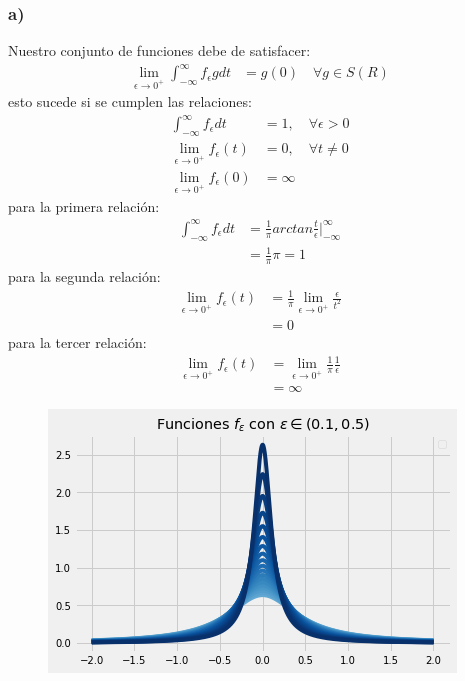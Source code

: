 \documentclass{article}
\begin{document}
\begin{tcolorbox}[breakable]
    \subsubsection*{a)}
    Nuestro conjunto de funciones debe de satisfacer:
    \begin{align*}
        \lim_{\epsilon \to 0^+} \int_{-\infty}^\infty f_\epsilon g dt &= g(0)
        \quad \forall g \in S(R)
    \end{align*}
    esto sucede si se cumplen las relaciones: 
    \begin{align*}
        \int_{-\infty}^\infty f_{\epsilon}dt &= 1, \quad \forall \epsilon > 0 \\
        \lim_{\epsilon \rightarrow 0^+}f_\epsilon (t) &= 0, \quad \forall t \neq 0 \\
        \lim_{\epsilon \rightarrow 0^+}f_\epsilon (0) &= \infty
    \end{align*}
    para la primera relación:
    \begin{align*}
        \int_{-\infty}^\infty f_{\epsilon}dt 
        &= \frac{1}{\pi} arctan\frac{t}{\epsilon} \biggr\rvert_{-\infty}^\infty \\
        &= \frac{1}{\pi} \pi = 1
    \end{align*}
    para la segunda relación:
    \begin{align*}
        \lim_{\epsilon \rightarrow 0^+} f_\epsilon (t) 
        &=\frac{1}{\pi} \lim_{\epsilon \rightarrow 0^+} \frac{\epsilon}{t^2} \\ 
        &= 0
    \end{align*}
    para la tercer relación:
    \begin{align*}
        \lim_{\epsilon \rightarrow 0^+} f_\epsilon (t) 
        &=\lim_{\epsilon \rightarrow 0^+} \frac{1}{\pi} \frac{1}{\epsilon} \\
        &= \infty
    \end{align*}
    \begin{figure}[H]
        \centering 
        \includegraphics[scale=0.7]{images/p2_f.png}
    \end{figure}

\end{tcolorbox}
\end{document}
